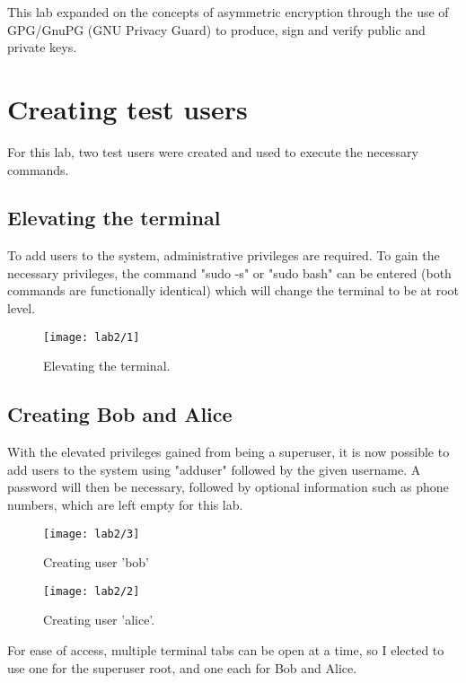 This lab expanded on the concepts of asymmetric encryption through the use of\newline
GPG/GnuPG (GNU Privacy Guard) to produce, sign and verify public and private keys.

\section{Creating test users}\label{sec:testUsers}
For this lab, two test users were created and used to execute the necessary commands.

\subsection{Elevating the terminal}\label{subsec:sudo}
To add users to the system, administrative privileges are required.
To gain the necessary privileges, the command "sudo -s" or "sudo bash" can be entered
(both commands are functionally identical) which will change the terminal to be at root level.

\begin{figure}[H]
    \centering
    \texttt{[image: lab2/1]}
    \caption{Elevating the terminal.}
    \label{fig:sudo}
\end{figure}

\subsection{Creating Bob and Alice}\label{subsec:createUsers}
With the elevated privileges gained from being a superuser, it is now possible to add users to the system using
"adduser" followed by the given username.
A password will then be necessary, followed by optional information such as phone numbers, which are left empty
for this lab.

\begin{figure}[H]
    \centering
    \texttt{[image: lab2/3]}
    \caption{Creating user 'bob'}
    \label{fig:createBob}
\end{figure}

\begin{figure}[H]
    \centering
    \texttt{[image: lab2/2]}
    \caption{Creating user 'alice'.}
    \label{fig:createAlice}
\end{figure}

For ease of access, multiple terminal tabs can be open at a time, so I elected to use one for the superuser root,
and one each for Bob and Alice.

